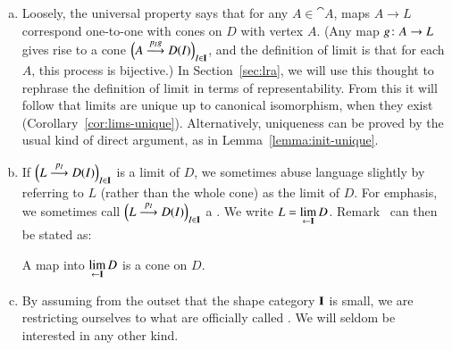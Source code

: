 \begin{remarks} 
\label{rmks:defn-lim}
\begin{enumerate}[(b)]
\item	
\label{rmk:defn-lim-univ} 
Loosely, the universal property says that for any $A \in \cat{A}$, maps $A
\to L$ correspond one-to-one with cones on $D$ with vertex $A$.  (Any map
$g\from A \to L$ gives rise to a cone $\Bigl( A \stackrel{p_I g}{\longrightarrow} D(I) \Bigr)_{I
  \in \mathbf{I}}$, and the definition of limit is that for each $A$, this
process is bijective.)  In Section~\ref{sec:lra}, we will use this thought
to rephrase the definition of limit in terms of representability.  From
this it will follow that limits are unique up to canonical isomorphism,
when they exist (Corollary~\ref{cor:lims-unique}).  Alternatively,
uniqueness can be proved by the usual kind of direct argument, as in
Lemma~\ref{lemma:init-unique}.

\item 
If $\Bigl( L \stackrel{p_I}{\longrightarrow} D(I) \Bigr)_{I \in \mathbf{I}}$ is a limit of $D$, we
sometimes abuse language slightly by referring to $L$ (rather than the
whole cone) as the limit%
%
%
of $D$.  For emphasis, we sometimes call $\Bigl( L \stackrel{p_I}{\longrightarrow} D(I)
\Bigr)_{I \in \mathbf{I}}$ a .  We write $L = \lim\limits_{\leftarrow \mathbf{I}} D$.%
%
%
Remark~ can then be stated as:
% 
\begin{slogan}
A map into $\lim\limits_{\leftarrow \mathbf{I}} D$ is a cone on $D$.
\end{slogan}

\item   
\label{rmks:defn-lim:small}
By assuming from the outset that the shape category $\mathbf{I}$ is small, we
are restricting ourselves to what are officially called .  We will seldom be interested in any other kind.
\end{enumerate}
\end{remarks}

